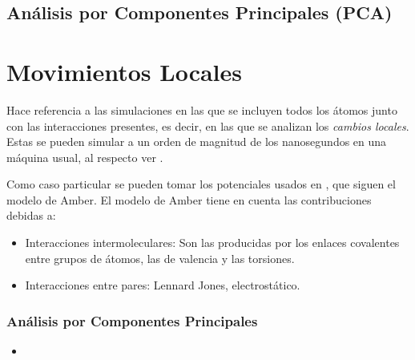 \subsection{An\'{a}lisis por Componentes Principales (PCA)}
\section{Movimientos Locales}
Hace referencia a las simulaciones en las que se incluyen todos los \'{a}tomos junto con las interacciones presentes, es decir, en las que se analizan los \textit{cambios locales}. Estas se pueden simular a un orden de magnitud de los nanosegundos en una m\'{a}quina usual, al respecto ver \cite{Gur2013GlobalPredictions.}.

Como caso particular se pueden tomar los potenciales usados en \cite{Amber2016AmberManual}, que siguen el modelo de Amber. El modelo de Amber tiene en cuenta las contribuciones debidas a:
 \begin{itemize}
\item Interacciones intermoleculares: Son las producidas por los enlaces covalentes entre grupos de \'{a}tomos, las de valencia y las torsiones.
\item Interacciones entre pares: Lennard Jones, electrost\'{a}tico.
\end{itemize}

\subsubsection{An\'{a}lisis por Componentes Principales}

\begin{itemize}
\item 
\end{itemize}

